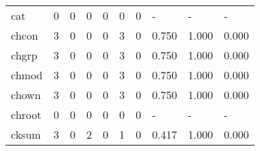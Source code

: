 \begin{longtable}{lp{1.3cm}p{1.3cm}p{1.3cm}p{1.3cm}p{1.3cm}p{1.3cm}p{1.3cm}p{1.3cm}p{1.3cm}}
cat       &                      0 &                                             0 &                                            0 &                                           0 &                                            0 &                                          0 &                                    - &                                      - &                                    - \\
chcon     &                      3 &                                             0 &                                            0 &                                           0 &                                            3 &                                          0 &                                0.750 &                                  1.000 &                                0.000 \\
chgrp     &                      3 &                                             0 &                                            0 &                                           0 &                                            3 &                                          0 &                                0.750 &                                  1.000 &                                0.000 \\
chmod     &                      3 &                                             0 &                                            0 &                                           0 &                                            3 &                                          0 &                                0.750 &                                  1.000 &                                0.000 \\
chown     &                      3 &                                             0 &                                            0 &                                           0 &                                            3 &                                          0 &                                0.750 &                                  1.000 &                                0.000 \\
chroot    &                      0 &                                             0 &                                            0 &                                           0 &                                            0 &                                          0 &                                    - &                                      - &                                    - \\
cksum     &                      3 &                                             0 &                                            2 &                                           0 &                                            1 &                                          0 &                                0.417 &                                  1.000 &                                0.000 \\

\end{longtable}
